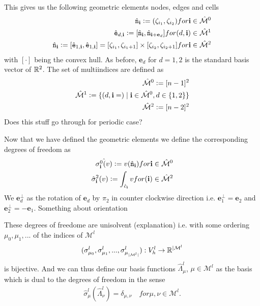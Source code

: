 \documentclass[../master_thesis.tex]{subfiles}
\begin{document}
This gives us the following geometric elements nodes, edges and cells
\begin{align*}
    \hat{\mathtt{n}}_\mathbf{i} \vcentcolon= (\zeta_{i_1}, \zeta_{i_2}) for \mathbf{i} \in \hat{\mathcal{M}}^0
    \\ \hat{\mathtt{e}}_{d,\mathbf{i}} 
        \vcentcolon= [\hat{\mathtt{n}}_\mathbf{i}, \hat{\mathtt{n}}_{\mathbf{i} + \mathbf{e}_d}] 
        for (d, \mathbf{i}) \in \hat{\mathcal{M}}^1
    \\ \hat{\mathtt{n}}_\mathbf{i} \vcentcolon= [\hat{\mathtt{e}}_{1,\mathbf{i}}, \hat{\mathtt{e}}_{1,\mathbf{i}}]
        = [\zeta_{i_1}, \zeta_{i_1+1}] \times [\zeta_{i_2}, \zeta_{i_2+1}] 
        for \mathbf{i} \in \hat{\mathcal{M}}^2 
\end{align*}
with $[\cdot]$ being the convex hull. As before, $\mathbf{e}_d$ for $d = 1,2$ is the 
standard basis vector of $\mathbb{R}^2$. The set of multiindices are defined as
\begin{align*}
    \hat{\mathcal{M}}^0 \vcentcolon= [n-1]^2
    \\ \hat{\mathcal{M}}^1 \vcentcolon= \{ (d, \mathbf{i}=) \mid \mathbf{i} \in \hat{\mathcal{M}}^0, d\in \{1,2\} \}
    \\ \hat{\mathcal{M}}^2 \vcentcolon= [n-2]^2
\end{align*}
{\color{red} Does this stuff go through for periodic case?}

Now that we have defined the geometric elements we define the corresponding 
degrees of freedom as 
\begin{align*}
    \hat{\sigma_\mathbf{i}^0(v) } \vcentcolon= v(\hat{\mathtt{n}}_\mathbf{i}) for \mathbf{i} \in \hat{\mathcal{M}}^0
    \\ \hat{\sigma}_{\mathbf{i}}^2(v) 
        \vcentcolon= \int_{\hat{c}_{\mathbf{i}}} v 
        for (\mathbf{i}) \in \hat{\mathcal{M}}^2
\end{align*}
We $\mathbf{e}_d^\perp$ as the rotation of $\mathbf{e}_d$ by $\pi_2$ in counter clockwise 
direction i.e. $\mathbf{e}^\perp_1= \mathbf{e}_2$ and $\mathbf{e}^\perp_2= -\mathbf{e}_1$.  
Something about orientation


These degrees of freedome are unisolvent (explanation) i.e. 
with some ordering $\mu_0, \mu_1, ...$ of the indices of $\mathcal{M}^l$
\begin{align*}
    (\sigma^l_{\mu_0}, \sigma^l_{\mu_1}, ..., \sigma^l_{\mu_{|\mathcal{M}^l|}}):
    V^l_h \rightarrow \mathbb{R}^{|\mathcal{M}^l}
\end{align*}
is bijective.
And we can thus define our basis functions 
$\hat{\Lambda}^l_\mu$, $\mu \in \mathcal{M}^l$ as the basis which is dual to the 
degrees of freedom in the sense 
\begin{align*}
    \hat{\sigma}_\mu^l(\hat{\Lambda}^l_\nu) = \delta_{\mu,\nu} \quad for \mu, \nu \in \mathcal{M}^l.
\end{align*}
\end{document}
